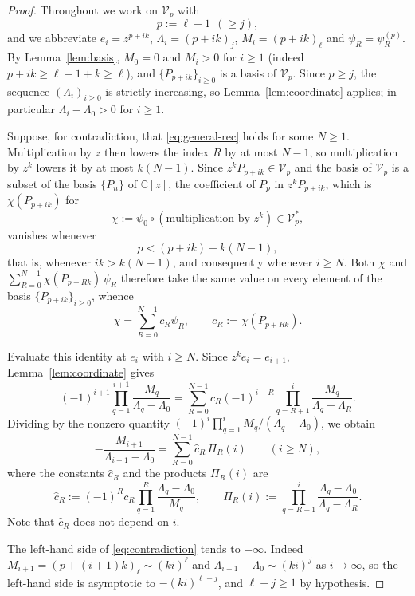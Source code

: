 \documentclass[10pt,a4paper]{amsart}
\newcommand{\C}{\mathbb C}
\newcommand{\fall}[2]{(#1)_{#2}}
\begin{document}
\begin{proof}
Throughout we work on \(\mathcal V_p\) with
\[
p:=\ell-1\ \ (\ge j),
\]
and we abbreviate \(e_i=z^{p+ik}\), \(\Lambda_i=\fall{p+ik}{j}\),
\(M_i=\fall{p+ik}{\ell}\) and \(\psi_R=\psi^{(p)}_R\).  By
Lemma~\ref{lem:basis}, \(M_0=0\) and \(M_i>0\) for \(i\ge1\) (indeed
\(p+ik\ge\ell-1+k\ge\ell\)), and \(\{P_{p+ik}\}_{i\ge0}\) is a basis of
\(\mathcal V_p\).  Since \(p\ge j\), the sequence \((\Lambda_i)_{i\ge0}\) is
strictly increasing, so Lemma~\ref{lem:coordinate} applies; in particular
\(\Lambda_i-\Lambda_0>0\) for \(i\ge1\).

Suppose, for contradiction, that \eqref{eq:general-rec} holds for some
\(N\ge1\).  Multiplication by \(z\) then lowers the index \(R\) by at most
\(N-1\), so multiplication by \(z^k\) lowers it by at most \(k(N-1)\).
Since \(z^k P_{p+ik}\in\mathcal V_p\) and the basis of \(\mathcal V_p\) is a
subset of the basis \(\{P_n\}\) of \(\C[z]\), the coefficient of \(P_p\) in
\(z^k P_{p+ik}\), which is \(\chi(P_{p+ik})\) for
\[
\chi:=\psi_0\circ(\text{multiplication by }z^k)\in\mathcal V_p^{*},
\]
vanishes whenever
\[
p<(p+ik)-k(N-1),
\]
that is, whenever \(ik>k(N-1)\), and consequently whenever \(i\ge N\).
Both \(\chi\) and
\(\sum_{R=0}^{N-1}\chi(P_{p+Rk})\,\psi_R\) therefore take the same value on
every element of the basis \(\{P_{p+ik}\}_{i\ge0}\), whence
\[
\chi=\sum_{R=0}^{N-1}c_R\psi_R,
\qquad c_R:=\chi(P_{p+Rk}).
\]

Evaluate this identity at \(e_i\) with \(i\ge N\).  Since \(z^k e_i=e_{i+1}\),
Lemma~\ref{lem:coordinate} gives
\[
(-1)^{i+1}\prod_{q=1}^{i+1}\frac{M_q}{\Lambda_q-\Lambda_0}
=
\sum_{R=0}^{N-1}c_R(-1)^{i-R}
\prod_{q=R+1}^{i}\frac{M_q}{\Lambda_q-\Lambda_R}.
\]
Dividing by the nonzero quantity
\((-1)^i\prod_{q=1}^{i}M_q/(\Lambda_q-\Lambda_0)\), we obtain
\begin{equation}\label{eq:contradiction}
-\frac{M_{i+1}}{\Lambda_{i+1}-\Lambda_0}
=
\sum_{R=0}^{N-1}\widehat c_R\,\Pi_R(i)
\qquad (i\ge N),
\end{equation}
where the constants \(\widehat c_R\) and the products \(\Pi_R(i)\) are
\[
\widehat c_R
:=(-1)^R c_R\prod_{q=1}^{R}\frac{\Lambda_q-\Lambda_0}{M_q},
\qquad
\Pi_R(i):=\prod_{q=R+1}^{i}\frac{\Lambda_q-\Lambda_0}{\Lambda_q-\Lambda_R}.
\]
Note that \(\widehat c_R\) does not depend on \(i\).

The left-hand side of \eqref{eq:contradiction} tends to \(-\infty\).  Indeed
\(M_{i+1}=\fall{p+(i+1)k}{\ell}\sim(ki)^{\ell}\) and
\(\Lambda_{i+1}-\Lambda_0\sim(ki)^{j}\) as \(i\to\infty\), so the left-hand
side is asymptotic to \(-(ki)^{\ell-j}\), and \(\ell-j\ge1\) by hypothesis.


\end{proof}
\end{document}

